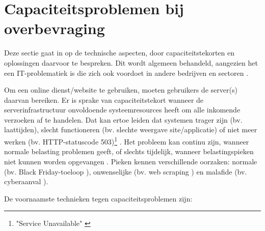 
\section{Capaciteitsproblemen bij overbevraging}

Deze sectie gaat in op de technische aspecten,
door capaciteitstekorten en oplossingen daarvoor te bespreken.
Dit wordt algemeen behandeld,
aangezien het een IT-problematiek is 
die zich ook voordoet in andere bedrijven en
sectoren \cite{warren2023chatgpt, warren2020discord, reuters2023what}.

Om een online dienst/website te gebruiken, moeten gebruikers de
server(s) daarvan bereiken. Er is sprake van
capaciteitstekort wanneer de serverinfrastructuur onvoldoende systeemresources
heeft om alle inkomende verzoeken af te handelen.
Dat kan ertoe leiden dat systemen trager zijn (bv. laattijden),
slecht functioneren (bv. slechte weergave site/applicatie) of
niet meer werken (bv. HTTP-statuscode
503)\footnote{"Service Unavailable" \cite{fielding2022http}}
\cite{guitart2010survey, guitart2007designing}.
Het probleem kan continu zijn, wanneer normale belasting problemen
geeft, of slechts tijdelijk, wanneer belastingspieken niet kunnen worden
opgevangen \cite{schroeder2006web}. Pieken kennen verschillende oorzaken:
normale (bv. Black Friday-toeloop \cite{iyer2001overload}),
onwenselijke (bv. web scraping \cite{thelwall2006web}) en
malafide (bv. cyberaanval \cite{loukas2009protection}).

De voornaamste technieken tegen capaciteitsproblemen zijn:

